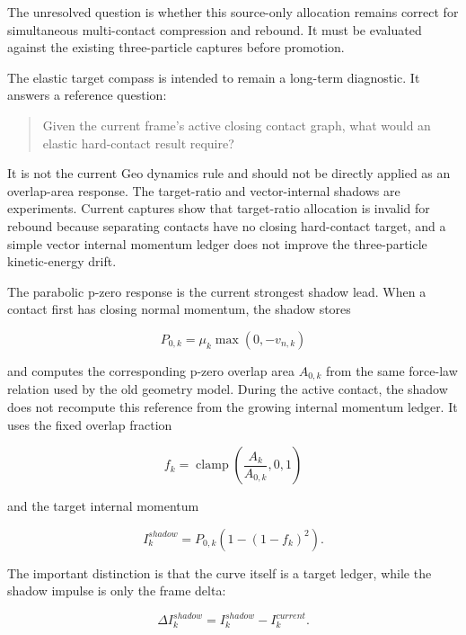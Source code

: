 The unresolved question is whether this source-only allocation remains correct
for simultaneous multi-contact compression and rebound.  It must be evaluated
against the existing three-particle captures before promotion.

The elastic target compass is intended to remain a long-term diagnostic.  It
answers a reference question:

\begin{quote}
Given the current frame's active closing contact graph, what would an elastic
hard-contact result require?
\end{quote}

It is not the current Geo dynamics rule and should not be directly applied as
an overlap-area response.  The target-ratio and vector-internal shadows are
experiments.  Current captures show that target-ratio allocation is invalid for
rebound because separating contacts have no closing hard-contact target, and a
simple vector internal momentum ledger does not improve the three-particle
kinetic-energy drift.

The parabolic p-zero response is the current strongest shadow lead.  When a
contact first has closing normal momentum, the shadow stores

\begin{equation}
P_{0,k} = \mu_k \max(0,-v_{n,k})
\end{equation}

and computes the corresponding p-zero overlap area \(A_{0,k}\) from the same
force-law relation used by the old geometry model.  During the active contact,
the shadow does not recompute this reference from the growing internal
momentum ledger.  It uses the fixed overlap fraction

\begin{equation}
f_k = \operatorname{clamp}\left(\frac{A_k}{A_{0,k}},0,1\right)
\end{equation}

and the target internal momentum

\begin{equation}
I^{shadow}_{k}
=
P_{0,k}\left(1-\left(1-f_k\right)^2\right).
\end{equation}

The important distinction is that the curve itself is a target ledger, while
the shadow impulse is only the frame delta:

\begin{equation}
\Delta I^{shadow}_{k}=I^{shadow}_{k}-I^{current}_{k}.
\end{equation}

